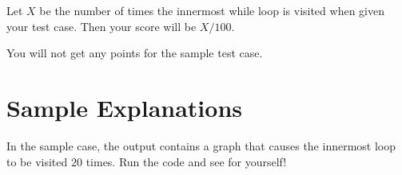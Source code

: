 Let $X$ be the number of times the innermost while loop is visited when given your test case.
Then your score will be $X / 100$.

You will not get any points for the sample test case.

\section*{Sample Explanations}

In the sample case, the output contains a graph that causes the innermost loop to be visited $20$
times. Run the code and see for yourself!
